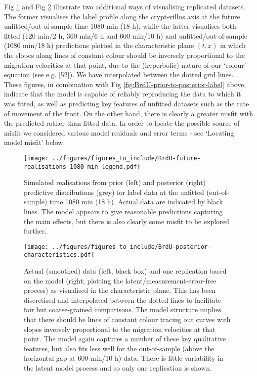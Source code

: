 \documentclass[10pt,letterpaper]{article}
\begin{document}
Fig \ref{fig:BrdU-future-realisations-1080-min} and Fig
\ref{fig:BrdU-posterior-characteristics} illustrate two additional ways
of visualising replicated datasets. The former visualises the label
profile along the crypt-villus axis at the future unfitted/out-of-sample
time 1080 min (18 h), while the latter visualises both fitted (120 min/2
h, 360 min/6 h and 600 min/10 h) and unfitted/out-of-sample (1080 min/18
h) predictions plotted in the characteristic plane \((t,x)\) in which
the slopes along lines of constant colour should be inversely
proportional to the migration velocities at that point, due to the
(hyperbolic) nature of our `colour' equation (see e.g. {[}52{]}). We
have interpolated between the dotted grid lines. These figures, in
combination with Fig \ref{fig:BrdU-prior-to-posterior-label} above,
indicate that the model is capable of reliably reproducing the data to
which it was fitted, as well as predicting key features of unfitted
datasets such as the rate of movement of the front. On the other hand,
there is clearly a greater misfit with the predicted rather than fitted
data. In order to locate the possible source of misfit we considered
various model residuals and error terms - see `Locating model misfit'
below.

\begin{figure}
\centering
\texttt{[image: ../figures/figures\_to\_include/BrdU-future-realisations-1080-min-legend.pdf]}
\caption{Simulated realisations from prior (left) and posterior (right)
predictive distributions (grey) for label data at the unfitted
(out-of-sample) time 1080 min (18 h). Actual data are indicated by black
lines. The model appears to give reasonable predictions capturing the
main effects, but there is also clearly some misfit to be explored
further.\label{fig:BrdU-future-realisations-1080-min}}
\end{figure}

\begin{figure}
\centering
\texttt{[image: ../figures/figures\_to\_include/BrdU-posterior-characteristics.pdf]}
\caption{Actual (smoothed) data (left, black box) and one replication
based on the model (right; plotting the latent/measurement-error-free
process) as visualised in the characteristic plane. This has been
discretised and interpolated between the dotted lines to facilitate fair
but coarse-grained comparisons. The model structure implies that there
should be lines of constant colour tracing out curves with slopes
inversely proportional to the migration velocities at that point. The
model again captures a number of these key qualitative features, but
also fits less well for the out-of-sample (above the horizontal gap at
600 min/10 h) data. There is little variability in the latent model
process and so only one replication is
shown.\label{fig:BrdU-posterior-characteristics}}
\end{figure}
\end{document}
